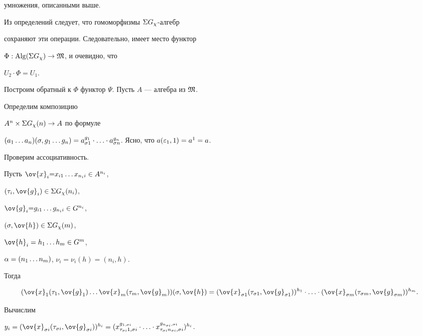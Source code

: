 \begin{pf}
умножения, описанными выше.


Из определений следует, что гомоморфизмы $\Sigma G_{\chi}$-алгебр


сохраняют эти операции. Следовательно, имеет место функтор\linebreak


$\Phi : \operatorname{Alg}(\Sigma G_{\chi}) \rightarrow {\frak M}$, и очевидно, что


$U_2 \cdot \Phi=U_1$.





Построим обратный к $\Phi$ функтор $\Psi$. Пусть $A$ --- алгебра из ${\frak M}$.


Определим композицию


$A^n \times \Sigma G_{\chi}(n) \rightarrow A$ по формуле


$(a_1 \dotsc a_n)(\s,g_1 \dotsc g_n)=a_{\s1}^{g_1} \cdot \dotsc


\cdot a_{\s{n}}^{g_n}$. Ясно, что $a(\ep_1,1)=a^1=a$.





Проверим ассоциативность.


Пусть $\ov{x}_i{=}x_{i1} \dotsc x_{n_{i} i} \in A^{n_i}$,


$(\t_i,\ov{g}_i) \in \sym G_{\chi}(n_i)$,


$\ov{g}_i{=}g_{i1} \dotsc g_{n_{i} i} \in G^{n_i}$,


$(\s,\ov{h}) \in \sym G_{\chi}(m)$,


$\ov{h}_i=h_{1} \dotsc h_{m} \in G^{m}$,


$\alpha=(n_1 \dotsc n_m)$, $\nu_i=\nu_i(h)=(n_i,h)$.


Тогда


$$


(\ov{x}_1(\t_1,\ov{g}_1) \dotsc \ov{x}_m(\t_m,\ov{g}_m))(\s,\ov{h})=


(\ov{x}_{\s1}(\t_{\s1},\ov{g}_{\s1}))^{h_1} \cdot \dotsc \cdot


(\ov{x}_{\s{m}}(\t_{\s{m}},\ov{g}_{\s{m}}))^{h_{m}}.


$$





Вычислим


$y_i=(\ov{x}_{\s{i}}(\t_{\s{i}},\ov{g}_{\s{i}}))^{h_{i}}


=(x_{ \t_{\s{i}}1,\s{i}}^{g_{1,\s{i}} } \cdot \dotsc \cdot


x_{ \t_{\s{i}}n_{\s{i}},\s{i}}^{ g_{ n_{\s{i}},\s{i} } })^{h_{i}}$.



\end{pf}

